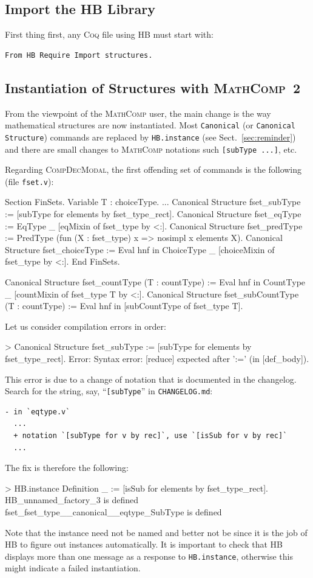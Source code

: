 \documentclass{article}
\def\coq{\textsc{Coq}}
\def\mathcomp{\textsc{MathComp}}
\def\mathcomptwo{\mathcomp~2}
\def\hb{\textsc{HB}}
\def\compdecmodal{\textsc{CompDecModal}}
\def\coqin#1{\texttt{#1}}
\begin{document}
\subsection{Import the \hb{} Library}

First thing first, any \coq{} file using \hb{} must start with:
\begin{verbatim}
From HB Require Import structures.
\end{verbatim}

\subsection{Instantiation of Structures with \mathcomptwo}

From the viewpoint of the \mathcomp{} user, the main change is the way
mathematical structures are now instantiated. Most \coqin{Canonical}
(or \coqin{Canonical Structure}) commands are replaced by
\coqin{HB.instance} (see Sect.~\ref{sec:reminder}) and there are small
changes to \mathcomp{} notations such \coqin{[subType ...]}, etc.

Regarding \compdecmodal, the first offending set of commands is the
following (file \coqin{fset.v}):
\begin{failure}
Section FinSets.
 Variable T : choiceType.
 ...
 Canonical Structure fset_subType := [subType for elements by fset_type_rect].
 Canonical Structure fset_eqType := EqType _ [eqMixin of fset_type by <:].
 Canonical Structure fset_predType := PredType (fun (X : fset_type) x => nosimpl x \in elements X).
 Canonical Structure fset_choiceType := Eval hnf in ChoiceType _ [choiceMixin of fset_type by <:].
End FinSets.

Canonical Structure fset_countType (T : countType) :=
  Eval hnf in CountType _ [countMixin of fset_type T by <:].
Canonical Structure fset_subCountType (T : countType) :=
  Eval hnf in [subCountType of fset_type T].
\end{failure}

Let us consider compilation errors in order:
\begin{failure}
> Canonical Structure fset_subType := [subType for elements by fset_type_rect].
Error: Syntax error: [reduce] expected after ':=' (in [def_body]).
\end{failure}
This error is due to a change of notation that is documented in the
changelog.  Search for the string, say, ``\coqin{[subType}'' in
\coqin{CHANGELOG.md}:
\begin{verbatim}
- in `eqtype.v`
  ...
  + notation `[subType for v by rec]`, use `[isSub for v by rec]`
  ...
\end{verbatim}
The fix is therefore the following:
\begin{success}
> HB.instance Definition _ := [isSub for elements by fset_type_rect].
HB_unnamed_factory_3 is defined
fset_fset_type__canonical__eqtype_SubType is defined
\end{success}
Note that the instance need not be named and better not be since it is
the job of \hb{} to figure out instances automatically.
%
It is important to check that \hb{} displays more than one message as
a response to \coqin{HB.instance}, otherwise this might indicate a
failed instantiation.
\end{document}
